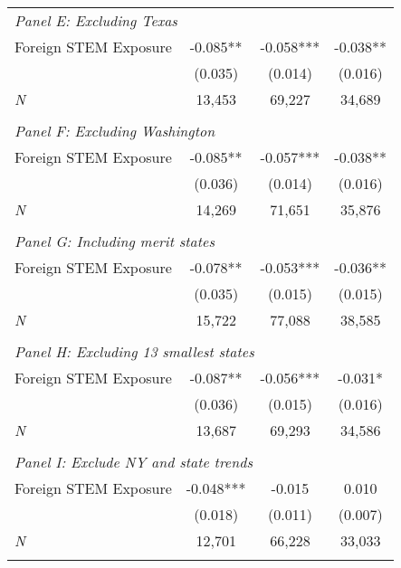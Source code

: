 \begin{table}[ht]
{\begin{threeparttable}
\begin{tabular}{lccc}
\multicolumn{4}{l}{\emph{Panel E: Excluding Texas}}\\ 
Foreign STEM Exposure & -0.085** & -0.058*** & -0.038** \\ 
 &  (0.035)        & (0.014)        & (0.016) \\ 
\emph{N} &     13,453          &    69,227          &    34,689 \\ 
                         &                              &                              &\\
\multicolumn{4}{l}{\emph{Panel F: Excluding Washington}}\\ 
Foreign STEM Exposure & -0.085** & -0.057*** & -0.038** \\ 
 &  (0.036)        & (0.014)        & (0.016) \\ 
\emph{N} &     14,269          &    71,651          &    35,876 \\ 
                         &                              &                              &\\
\multicolumn{4}{l}{\emph{Panel G: Including merit states}}\\ 
Foreign STEM Exposure & -0.078** & -0.053*** & -0.036** \\ 
 &  (0.035)        & (0.015)        & (0.015) \\ 
\emph{N} &     15,722          &    77,088          &    38,585 \\ 
                         &                              &                              &\\
\multicolumn{4}{l}{\emph{Panel H: Excluding 13 smallest states}}\\ 
Foreign STEM Exposure & -0.087** & -0.056*** & -0.031* \\ 
 &  (0.036)        & (0.015)        & (0.016) \\ 
\emph{N} &     13,687          &    69,293          &    34,586 \\ 
                         &                              &                              &\\
\multicolumn{4}{l}{\emph{Panel I: Exclude NY and state trends}}\\ 
Foreign STEM Exposure & -0.048*** & -0.015  & 0.010  \\ 
 &  (0.018)        & (0.011)        & (0.007) \\ 
\emph{N} &     12,701          &    66,228          &    33,033 \\ 
                         &                              &                              &\\

\end{tabular}
\end{threeparttable}}
\end{table}
